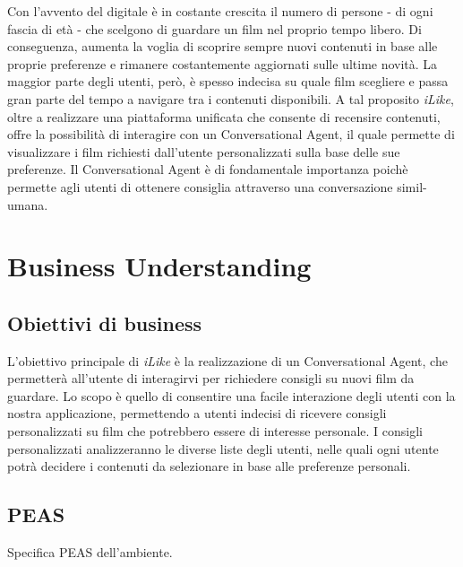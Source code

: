 \documentclass[a4paper, 10pt]{report}
\begin{document}
        Con l'avvento del digitale è in costante crescita il numero di persone - di ogni fascia di età - che scelgono
        di guardare un film nel proprio tempo libero. Di conseguenza, aumenta la voglia di scoprire sempre nuovi contenuti
        in base alle proprie preferenze e rimanere costantemente aggiornati sulle ultime novità. La maggior parte degli utenti,
        però, è spesso indecisa su quale film scegliere e passa gran parte del tempo a navigare tra i contenuti disponibili.
        A tal proposito \textit{iLike}, oltre a realizzare una piattaforma unificata che consente di recensire contenuti, offre
        la possibilità di interagire con un Conversational Agent, il quale permette di visualizzare i film richiesti dall'utente
        personalizzati sulla base delle sue preferenze.
        Il Conversational Agent è di fondamentale importanza poichè permette agli utenti di ottenere consiglia attraverso una
        conversazione simil-umana.


    \chapter{Business Understanding}\label{ch:business-understanding}

        \section{Obiettivi di business}\label{sec:obiettivi-di-business}

            L'obiettivo principale di \textit{iLike} è la realizzazione di un Conversational Agent, che permetterà all'utente di
            interagirvi per richiedere consigli su nuovi film da guardare. Lo scopo è quello di consentire una facile interazione degli utenti
            con la nostra applicazione, permettendo a utenti indecisi di ricevere consigli personalizzati su film che potrebbero essere di
            interesse personale. I consigli personalizzati analizzeranno le diverse liste degli utenti, nelle quali ogni utente potrà decidere i contenuti
            da selezionare in base alle preferenze personali.

        \section{PEAS}\label{sec:peas}

            Specifica PEAS dell'ambiente.
\end{document}
